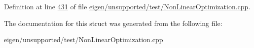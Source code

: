 Definition at line \hyperlink{eigen_2unsupported_2test_2_non_linear_optimization_8cpp_source_l00431}{431} of file \hyperlink{eigen_2unsupported_2test_2_non_linear_optimization_8cpp_source}{eigen/unsupported/test/\+Non\+Linear\+Optimization.\+cpp}.



The documentation for this struct was generated from the following file\+:\begin{DoxyCompactItemize}
\item 
eigen/unsupported/test/\+Non\+Linear\+Optimization.\+cpp\end{DoxyCompactItemize}
